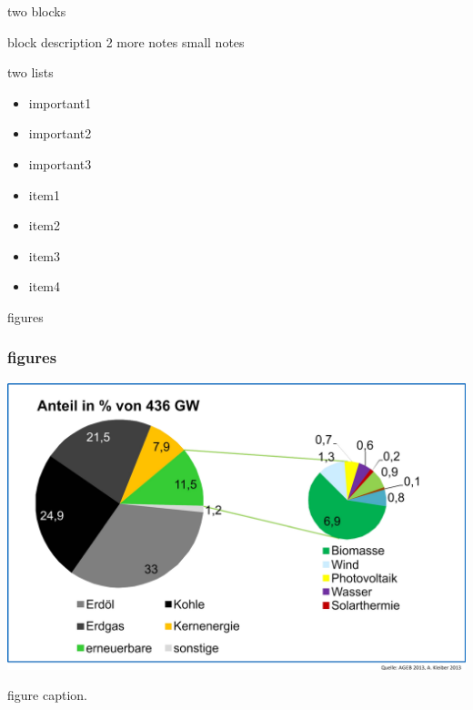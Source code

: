 \documentclass[final]{beamer} %
\begin{document}
\begin{frame}
\begin{minipage}[t]{.49\textwidth}
\begin{kasten}{\large two blocks}
      \begin{kasten}{block description 2}
        more notes {\tiny small notes}
      \end{kasten}
    \end{kasten}
    \begin{kasten}{\large two lists}
      \begin{itemize}
        \item important1 \cite{Feher13}
        \item important2
        \item important3
      \end{itemize}
      \begin{itemize}
        \item item1 \cite{Koenies12}
        \item item2
        \item item3
        \item item4
      \end{itemize}
    \end{kasten}
    \begin{kasten}{\large figures}
      \begin{center}
      \frametitle{figures}
      \begin{minipage}[]{0.45\textwidth}
        \includegraphics[width=\textwidth]{primaerenergieverbrauch_dt_2013}\par
        figure caption.
      \end{minipage}\hfill
      \begin{minipage}[]{0.45\textwidth}
			  \centerline{
}
\end{minipage}
\end{center}
\end{kasten}
\end{minipage}
\end{frame}
\end{document}
